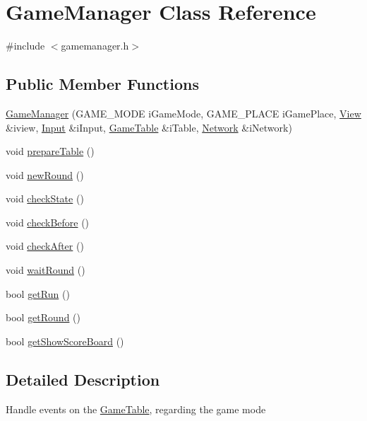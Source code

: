 \hypertarget{class_game_manager}{\section{Game\-Manager Class Reference}
\label{class_game_manager}
}


{\ttfamily \#include $<$gamemanager.\-h$>$}

\subsection*{Public Member Functions}
\begin{DoxyCompactItemize}
\item 
\hyperlink{class_game_manager_a7839921a3c7eaa16052890cbf86b093b}{Game\-Manager} (G\-A\-M\-E\-\_\-\-M\-O\-D\-E i\-Game\-Mode, G\-A\-M\-E\-\_\-\-P\-L\-A\-C\-E i\-Game\-Place, \hyperlink{class_view}{View} \&iview, \hyperlink{class_input}{Input} \&i\-Input, \hyperlink{class_game_table}{Game\-Table} \&i\-Table, \hyperlink{class_network}{Network} \&i\-Network)
\item 
void \hyperlink{class_game_manager_ad1dd337b7fc6bae5b9fd3e0de26bb548}{prepare\-Table} ()
\item 
void \hyperlink{class_game_manager_a90f35603718489d8070b2adcf625a7cb}{new\-Round} ()
\item 
void \hyperlink{class_game_manager_aad88dbf82b379ed4da787c3a5653f247}{check\-State} ()
\item 
void \hyperlink{class_game_manager_a5102a79dc2d2785295e0b7771ac5d37a}{check\-Before} ()
\item 
void \hyperlink{class_game_manager_aad272d9b3a79d5d75d8e5b0af0b8b2fe}{check\-After} ()
\item 
void \hyperlink{class_game_manager_ac91747a627d65c3ac3bc6ef70eed7e5b}{wait\-Round} ()
\item 
bool \hyperlink{class_game_manager_aa00720978f30b02d49d31c0ce8f9a01b}{get\-Run} ()
\item 
bool \hyperlink{class_game_manager_a9ff7fc6dc088a182b3207d157ceffad8}{get\-Round} ()
\item 
bool \hyperlink{class_game_manager_a2edd03773254fce2b264b9f5cc0679ed}{get\-Show\-Score\-Board} ()
\end{DoxyCompactItemize}


\subsection{Detailed Description}
Handle events on the \hyperlink{class_game_table}{Game\-Table}, regarding the game mode 

